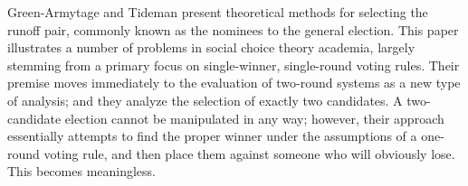 Green-Armytage and Tideman present theoretical methods for selecting the runoff pair, commonly known as the nominees to the general election.  This paper illustrates a number of problems in social choice theory academia, largely stemming from a primary focus on single-winner, single-round voting rules.  Their premise moves immediately to the evaluation of two-round systems as a new type of analysis; and they analyze the selection of exactly two candidates.  A two-candidate election cannot be manipulated in any way; however, their approach essentially attempts to find the proper winner under the assumptions of a one-round voting rule, and then place them against someone who will obviously lose.  This becomes meaningless.
